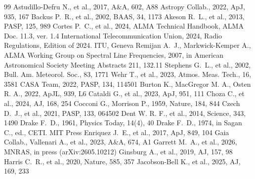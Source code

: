 \documentclass[twocolumn,twocolappendix]{openjournal}
\begin{document}
%
%
%
%
%
\begin{thebibliography}{99}
 Astudillo-Defru N., et al., 2017, A\&A, 602, A88
 Astropy Collab., 2022, ApJ, 935, 167
 Backus P.~R., et al., 2002, BAAS, 34, 1173
 Akeson R.~L., et al., 2013, PASP, 125, 989
 Cortes P.~C., et al., 2024, ALMA Technical Handbook, ALMA Doc. 11.3, ver. 1.4
 International Telecommunication Union, 2024, Radio Regulations, Edition of 2024. ITU, Geneva
 Remijan A.~J., Markwick-Kemper A., ALMA Working Group on Spectral Line Frequencies, 2007, in American Astronomical Society Meeting Abstracts 211, 132.11
 Stephens G.~L., et al., 2002, Bull. Am. Meteorol. Soc., 83, 1771
 Wehr T., et al., 2023, Atmos. Meas. Tech., 16, 3581
 CASA Team, 2022, PASP, 134, 114501
 Burton K., MacGregor M. A., Osten R. A., 2022, ApJL, 939, L6
 Cataldi G., et al., 2023, ApJ, 951, 111
 Choza C., et al., 2024, AJ, 168, 254
 Cocconi G., Morrison P., 1959, Nature, 184, 844
 Czech D.~J., et al., 2021, PASP, 133, 064502
 Dent W. R. F., et al., 2014, Science, 343, 1490
 Drake F.~D., 1961, Physics Today, 14(4), 40
 Drake F.~D., 1974, in Sagan C., ed., CETI. MIT Press
 Enriquez J.~E., et al., 2017, ApJ, 849, 104
 Gaia Collab., Vallenari A., et al., 2023, A\&A, 674, A1
 Garrett M.~A., et al., 2026, MNRAS, in press (arXiv:2605.10212)
 Ginsburg A., et al., 2019, AJ, 157, 98
 Harris C.~R., et al., 2020, Nature, 585, 357
 Jacobson-Bell K., et al., 2025, AJ, 169, 233

\end{thebibliography}
\end{document}
